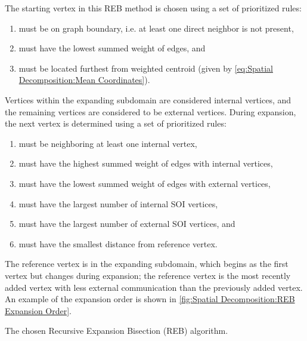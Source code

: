{{{{        The starting vertex in this \ac{REB} method is chosen using a set of prioritized rules:
        \begin{enumerate}
            \item{must be on graph boundary, i.e. at least one direct neighbor is not present,}
            \item{must have the lowest summed weight of edges, and}
            \item{must be located furthest from weighted centroid (given by \cref{eq:Spatial Decomposition:Mean Coordinates}).}
        \end{enumerate}
        Vertices within the expanding subdomain are considered internal vertices, and the remaining vertices are considered to be external vertices.
        During expansion, the next vertex is determined using a set of prioritized rules:
        \begin{enumerate}
            \item{must be neighboring at least one internal vertex,}
            \item{must have the highest summed weight of edges with internal vertices,}
            \item{must have the lowest summed weight of edges with external vertices,}
            \item{must have the largest number of internal SOI vertices,}
            \item{must have the largest number of external SOI vertices, and}
            \item{must have the smallest distance from reference vertex.}
        \end{enumerate}
        The reference vertex is in the expanding subdomain, which begins as the first vertex but changes during expansion; the reference vertex is the most recently added vertex with less external communication than the previously added vertex.
        An example of the expansion order is shown in \cref{fig:Spatial Decomposition:REB Expansion Order}.

        \begin{algorithm}
          \centering
          \caption{The chosen Recursive Expansion Bisection (REB) algorithm.}
          \label{alg:Recursive Expansion Bisection}
          \begin{algorithmic}[1]
            \EndProcedure
          \end{algorithmic}
        \end{algorithm}

}}}}
